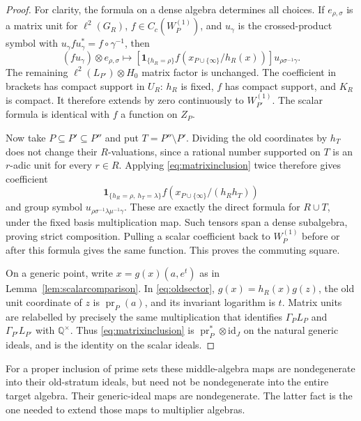 \documentclass[11pt]{article}
\newcommand{\Q}{\mathbb Q}
\newcommand{\one}{\mathbf 1}
\theoremstyle{definition}
\theoremstyle{remark}
\begin{document}
\begin{proof}
For clarity, the formula on a dense algebra determines all choices. If $e_{\rho,\sigma}$ is a matrix unit for $\ell^2(G_R)$, $f\in C_c(W_P^{(1)})$, and $u_\gamma$ is the crossed-product symbol with $u_\gamma f u_\gamma^*=f\circ\gamma^{-1}$, then
\begin{equation}\label{eq:matrixinclusion}
 (f u_\gamma)\otimes e_{\rho,\sigma}
 \longmapsto
 \left[\one_{\{h_R=\rho\}}
 f\!\left(x_{P\cup\{\infty\}}/h_R(x)\right)\right]
 u_{\rho\sigma^{-1}\gamma}.
\end{equation}
The remaining $\ell^2(L_{P'})\otimes H_0$ matrix factor is unchanged. The coefficient in brackets has compact support in $U_R$: $h_R$ is fixed, $f$ has compact support, and $K_R$ is compact. It therefore extends by zero continuously to $W_{P'}^{(1)}$. The scalar formula is identical with $f$ a function on $Z_P$.

Now take $P\subseteq P'\subseteq P''$ and put $T=P''\setminus P'$. Dividing the old coordinates by $h_T$ does not change their $R$-valuations, since a rational number supported on $T$ is an $r$-adic unit for every $r\in R$. Applying \eqref{eq:matrixinclusion} twice therefore gives coefficient
\[
 \one_{\{h_R=\rho,\ h_T=\lambda\}}
 f\!\left(x_{P\cup\{\infty\}}/(h_Rh_T)\right)
\]
and group symbol $u_{\rho\sigma^{-1}\lambda\mu^{-1}\gamma}$. These are exactly the direct formula for $R\cup T$, under the fixed basis multiplication map. Such tensors span a dense subalgebra, proving strict composition. Pulling a scalar coefficient back to $W_P^{(1)}$ before or after this formula gives the same function. This proves the commuting square.

On a generic point, write $x=g(x)(a,e^t)$ as in Lemma~\ref{lem:scalarcomparison}. In \eqref{eq:oldsector}, $g(x)=h_R(x)g(z)$, the old unit coordinate of $z$ is $\operatorname{pr}_P(a)$, and its invariant logarithm is $t$. Matrix units are relabelled by precisely the same multiplication that identifies $\Gamma_P L_P$ and $\Gamma_{P'}L_{P'}$ with $\Q^\times$. Thus \eqref{eq:matrixinclusion} is $\operatorname{pr}_P^*\otimes\mathrm{id}_J$ on the natural generic ideals, and is the identity on the scalar ideals.
\end{proof}

For a proper inclusion of prime sets these middle-algebra maps are nondegenerate into their old-stratum ideals, but need not be nondegenerate into the entire target algebra. Their generic-ideal maps are nondegenerate. The latter fact is the one needed to extend those maps to multiplier algebras.
\end{document}
